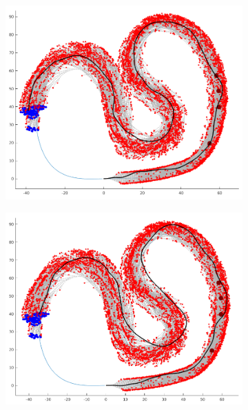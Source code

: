 \begin{figure}[h]
	\begin{subfigure}{.49\textwidth}
		\includegraphics[width=\textwidth]{figures/dyn_prog_no_obs_avoid.png}
	\end{subfigure}
	\begin{subfigure}{.49\textwidth}
		\includegraphics[width=\textwidth]{figures/dyn_prog_obs_avoid.png}
	\end{subfigure}
	\begin{subfigure}{.49\textwidth}

\end{subfigure}
\end{figure}
